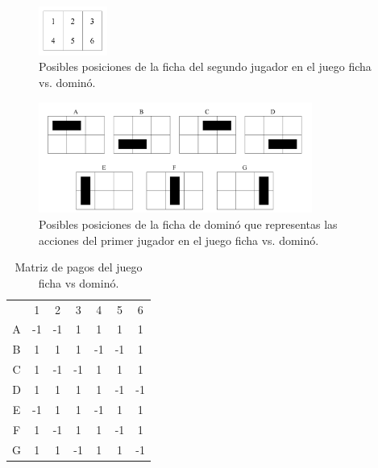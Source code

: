 \begin{figure}[h]
\centering
\includegraphics[width=0.2\textwidth]{figuras/posiciones.png}
\caption{Posibles posiciones de la ficha del segundo jugador en el juego ficha vs. dominó.}
\label{fig:posiciones}
\end{figure}

\begin{figure}[h]
\centering
\includegraphics[width=0.8\textwidth]{figuras/posiciones-domino.png}
\caption{Posibles posiciones de la ficha de dominó que representas las acciones del primer jugador en el juego ficha vs. dominó.}
\label{fig:posiciones-domino}
\end{figure}

\begin{table}[h]
\begin{center}
\caption{Matriz de pagos del juego ficha vs dominó.}
\label{table:pagos-domino}
\begin{tabular}{ c | c | c | c | c | c | c |}
\multicolumn{1}{c}{}  &  \multicolumn{1}{c}{1} &  \multicolumn{1}{c}{2} & \multicolumn{1}{c}{3} & \multicolumn{1}{c}{4} & \multicolumn{1}{c}{5} & \multicolumn{1}{c}{6} \\ \cline{2-7}
A & -1 & -1 &  1 &  1 &  1 &  1 \\ \cline{2-7}
B &  1 &  1 &  1 & -1 & -1 &  1 \\ \cline{2-7}
C &  1 & -1 & -1 &  1 &  1 &  1 \\ \cline{2-7}
D &  1 &  1 &  1 &  1 & -1 & -1 \\ \cline{2-7}
E & -1 &  1 &  1 & -1 &  1 &  1 \\ \cline{2-7}
F &  1 & -1 &  1 &  1 & -1 &  1 \\ \cline{2-7}
G &  1 &  1 & -1 &  1 &  1 & -1 \\ \cline{2-7}
\end{tabular}
\end{center}
\end{table}

